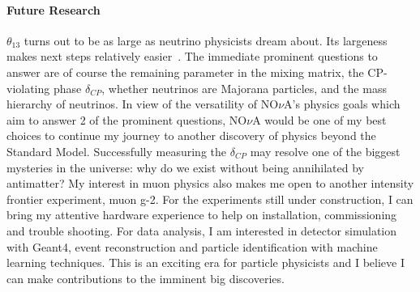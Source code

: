 \documentclass[11pt]{article}
\begin{document}
\paragraph*{Future Research}

$\theta_{13}$ turns out to be as large as neutrino physicists dream about. Its largeness makes next steps relatively easier~\cite{HM2011}. The immediate prominent questions to answer are of course the remaining parameter in the mixing matrix, the CP-violating phase $\delta_{CP}$, whether neutrinos are Majorana particles, and the mass hierarchy of neutrinos. In view of the versatility of NO$\nu$A's physics goals which aim to answer 2 of the prominent questions, NO$\nu$A would be one of my best choices to continue my journey to another discovery of physics beyond the Standard Model. Successfully measuring the $\delta_{CP}$ may resolve one of the biggest mysteries in the universe: why do we exist without being annihilated by antimatter? My interest in muon physics also makes me open to another intensity frontier experiment, muon g-2. For the experiments still under construction, I can bring my attentive hardware experience to help on installation, commissioning and trouble shooting. For data analysis, I am interested in detector simulation with Geant4, event reconstruction and particle identification with machine learning techniques. This is an exciting era for particle physicists and I believe I can make contributions to the imminent big discoveries.



\end{document}
